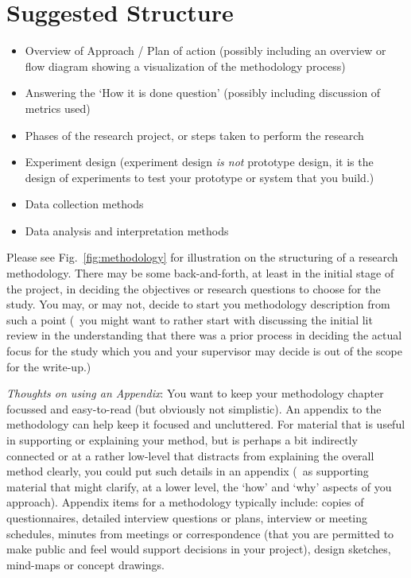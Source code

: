 \section{Suggested Structure}

\begin{itemize}
  \item Overview of Approach / Plan of action (possibly including an overview or flow diagram showing a visualization of the methodology process)
  \item Answering the `How it is done question' (possibly including discussion of metrics used)
  \item Phases of the research project, or steps taken to perform the research
  \item Experiment design (experiment design \emph{is not} prototype design, it is the design of experiments to test your prototype or system that you build.)
  \item Data collection methods
  \item Data analysis and interpretation methods
\end{itemize}

Please see Fig.~\ref{fig:methodology} for illustration on the structuring of a research methodology.  There may be some back-and-forth, at least in the initial stage of the project, in deciding the objectives or research questions to choose for the study.  You may, or may not, decide to start you methodology description from such a point (\ie~you might want to rather start with discussing the initial lit review in the understanding that there was a prior process in deciding the actual focus for the study which you and your supervisor may decide is out of the scope for the write-up.)


\emph{Thoughts on using an Appendix}: You want to keep your methodology chapter focussed and easy-to-read (but obviously not simplistic).  An appendix to the methodology can help keep it focused and uncluttered.  For material that is useful in supporting or explaining your method, but is perhaps a bit indirectly connected or at a rather low-level that distracts from explaining the overall method clearly, you could put such details in an appendix (\eg~as supporting material that might clarify, at a lower level, the `how' and `why' aspects of you approach).  Appendix items for a methodology typically include: copies of questionnaires, detailed interview questions or plans, interview or meeting schedules, minutes from meetings or correspondence (that you are permitted to make public and feel would support decisions in your project), design sketches, mind-maps or concept drawings.

